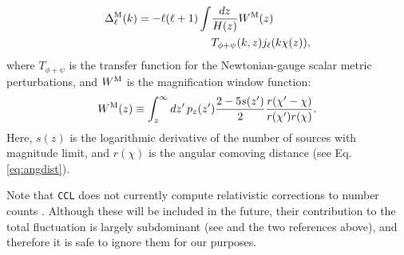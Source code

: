 \documentclass[\docopts]{\docclass}
\newcommand{\ccl}{{\tt CCL}\xspace}
\begin{document}
\begin{itemize}
        \begin{align}\nonumber
          \Delta_\ell^{\rm M}(k)=-\ell(\ell+1)\int & \frac{dz}{H(z)} W^{\rm M}(z) \\\label{eq:deltaM}
          &T_{\phi+\psi}(k,z) j_\ell(k\chi(z)),
        \end{align}
        where $T_{\phi+\psi}$ is the transfer function for the Newtonian-gauge scalar metric perturbations, and $W^{\rm M}$ is the magnification window function:
        \begin{equation}
          W^{\rm M}(z)\equiv\int_z^\infty dz'\,p_z(z')\frac{2-5s(z')}{2}\frac{r(\chi'-\chi)}{r(\chi')r(\chi)}.
        \end{equation}
        Here, $s(z)$ is the logarithmic derivative of the number of sources with magnitude limit, and $r(\chi)$ is the angular comoving distance (see Eq. \ref{eq:angdist}).
\end{itemize}
Note that \ccl does not currently compute relativistic corrections to number counts \citep{2011PhRvD..84d3516C,2011PhRvD..84f3505B}. Although these will be included in the future, their contribution to the total fluctuation is largely subdominant (see \citealt{GReffects} and the two references above), and therefore it is safe to ignore them for our purposes.
\end{document}
